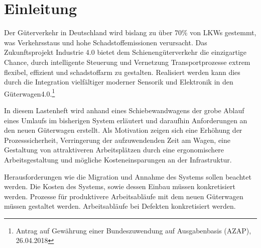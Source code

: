 \section{Einleitung}
Der Güterverkehr in Deutschland wird bislang zu über 70\% von LKWs gestemmt, was Verkehrsstaus und hohe Schadstoffemissionen verursacht. Das Zukunftsprojekt Industrie 4.0 bietet dem Schienengüterverkehr die einzigartige Chance, durch intelligente Steuerung und Vernetzung Transportprozesse extrem flexibel, effizient und schadstoffarm zu gestalten. Realisiert werden kann dies durch die Integration vielfältiger moderner Sensorik und Elektronik in den Güterwagen4.0.\footnote{Antrag auf Gewährung einer Bundeszuwendung auf Ausgabenbasis (AZAP), 26.04.2018}\par
In diesem Lastenheft wird anhand eines Schiebewandwagens der grobe Ablauf eines Umlaufs im bisherigen System erläutert und daraufhin Anforderungen an den neuen Güterwagen erstellt. Als Motivation zeigen sich %
eine Erhöhung der Prozesssicherheit, Verringerung der aufzuwendenden Zeit am Wagen, eine Gestaltung von attraktiveren Arbeitsplätzen durch eine ergonomischere Arbeitsgestaltung und mögliche Kosteneinsparungen an der Infrastruktur.\par
Herausforderungen wie die Migration und Annahme des Systems sollen beachtet werden. Die Kosten des Systems, sowie dessen Einbau müssen konkretisiert werden. Prozesse für produktivere Arbeitsabläufe mit dem neuen Güterwagen müssen gestaltet werden. Arbeitsabläufe bei Defekten konkretisiert werden.\\

